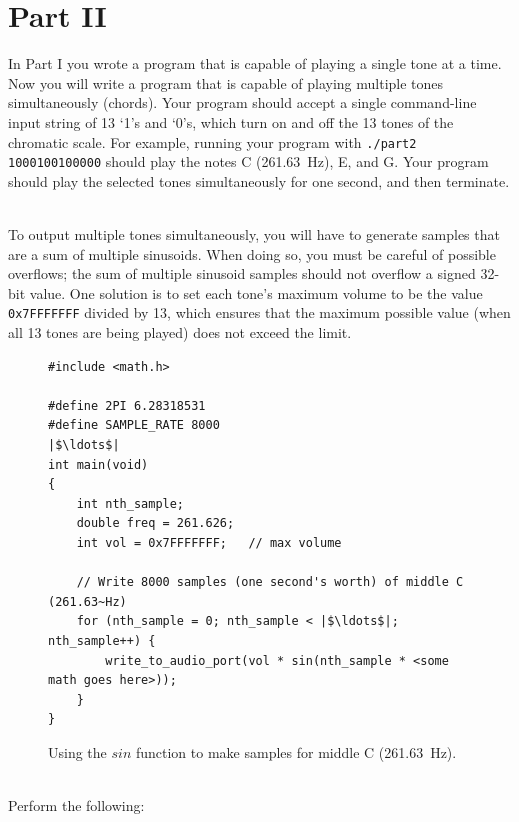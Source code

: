 \documentclass[epsfig,10pt,fullpage]{article}
\begin{document}
\noindent
\section*{Part II}

\noindent
In Part I you wrote a program that is capable of playing a single tone at a time. Now you will
write a program that is capable of playing multiple tones simultaneously (chords). Your program
should accept a single command-line input string of 13 `1's and `0's, 
which turn on and off the 13 tones
of the chromatic scale. For example, running your program with \texttt{./part2 1000100100000}
should play the notes C (261.63~Hz), E, and G. Your program should play the selected tones
simultaneously for one second, and then terminate. 

~\\
\noindent
To output multiple tones simultaneously, you will have to generate samples that are a sum of
multiple sinusoids. When doing so, you must be careful of possible overflows; the sum of multiple
sinusoid samples should not overflow a signed 32-bit value. One solution is to set 
each tone's maximum volume to be the value \texttt{0x7FFFFFFF} divided by 13, which ensures 
that the maximum possible value (when all 13 tones are being played) does not exceed the limit. 

\lstset{language=C,numbers=left,escapechar=|}
\begin{figure}[H]
\begin{center}
\begin{minipage}[t]{14.75 cm}
\begin{lstlisting}
#include <math.h>

#define 2PI 6.28318531
#define SAMPLE_RATE 8000
|$\ldots$|
int main(void)
{
	int nth_sample;
	double freq = 261.626;
	int vol = 0x7FFFFFFF;   // max volume

	// Write 8000 samples (one second's worth) of middle C (261.63~Hz)
	for (nth_sample = 0; nth_sample < |$\ldots$|; nth_sample++) {
		write_to_audio_port(vol * sin(nth_sample * <some math goes here>));
	}
}
\end{lstlisting}
\end{minipage}
\end{center}
\vspace{-0.33in}\caption{Using the $sin$ function to make samples for middle C (261.63~Hz).}
\label{fig:sinusoid_code}
\end{figure}

~\\
\noindent
Perform the following:
\end{document}
